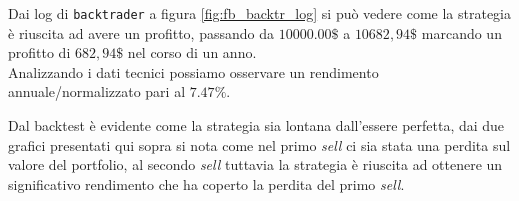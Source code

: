 Dai log di \verb|backtrader| a figura \ref{fig:fb_backtr_log} si può vedere come la strategia è riuscita ad avere un profitto,
passando da $10000.00\$$ a $10682,94\$$ marcando un profitto di $682,94\$$ nel corso di un anno.\\
Analizzando i dati tecnici possiamo osservare un rendimento annuale/normalizzato pari al $7.47\%$.

Dal backtest è evidente come la strategia sia lontana dall'essere perfetta, dai due grafici presentati qui sopra si nota come nel
primo \emph{sell} ci sia stata una perdita sul valore del portfolio, al secondo \emph{sell} tuttavia la strategia è riuscita ad ottenere
un significativo rendimento che ha coperto la perdita del primo \emph{sell}.

\pagebreak